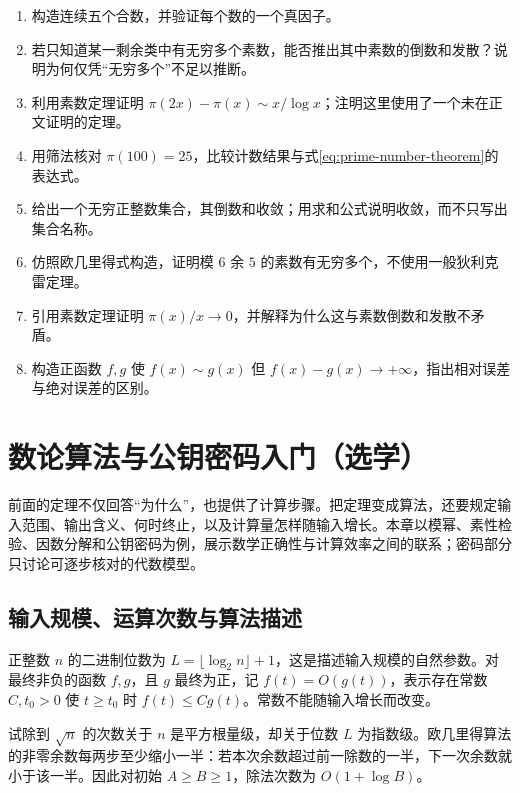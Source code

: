 \documentclass[UTF8,12pt,a4paper,fontset=fandol]{ctexbook}
\begin{document}
\begin{enumerate}
 \item 构造连续五个合数，并验证每个数的一个真因子。
 \item 若只知道某一剩余类中有无穷多个素数，能否推出其中素数的倒数和发散？说明为何仅凭“无穷多个”不足以推断。
 \item 利用素数定理证明 $\pi(2x)-\pi(x)\sim x/\log x$；注明这里使用了一个未在正文证明的定理。
 \item 用筛法核对 $\pi(100)=25$，比较计数结果与式\eqref{eq:prime-number-theorem}的表达式。
 \item\label{ex:distribution-sparse} 给出一个无穷正整数集合，其倒数和收敛；用求和公式说明收敛，而不只写出集合名称。
 \item\label{ex:distribution-six-five} 仿照欧几里得式构造，证明模 $6$ 余 $5$ 的素数有无穷多个，不使用一般狄利克雷定理。
 \item\label{ex:distribution-density} 引用素数定理证明 $\pi(x)/x\to0$，并解释为什么这与素数倒数和发散不矛盾。
 \item\label{ex:distribution-asymptotic} 构造正函数 $f,g$ 使 $f(x)\sim g(x)$ 但 $f(x)-g(x)\to+\infty$，指出相对误差与绝对误差的区别。
\end{enumerate}

\chapter{数论算法与公钥密码入门（选学）}
\label{ch:algorithms}

前面的定理不仅回答“为什么”，也提供了计算步骤。把定理变成算法，还要规定输入范围、输出含义、何时终止，以及计算量怎样随输入增长。本章以模幂、素性检验、因数分解和公钥密码为例，展示数学正确性与计算效率之间的联系；密码部分只讨论可逐步核对的代数模型。

\section{输入规模、运算次数与算法描述}

正整数 $n$ 的二进制位数为 $L=\lfloor\log_2n\rfloor+1$，这是描述输入规模的自然参数。对最终非负的函数 $f,g$，且 $g$ 最终为正，记 $f(t)=O(g(t))$，表示存在常数 $C,t_0>0$ 使 $t\ge t_0$ 时 $f(t)\le Cg(t)$。常数不能随输入增长而改变。

试除到 $\sqrt n$ 的次数关于 $n$ 是平方根量级，却关于位数 $L$ 为指数级。欧几里得算法的非零余数每两步至少缩小一半：若本次余数超过前一除数的一半，下一次余数就小于该一半。因此对初始 $A\ge B\ge1$，除法次数为 $O(1+\log B)$。
\end{document}
